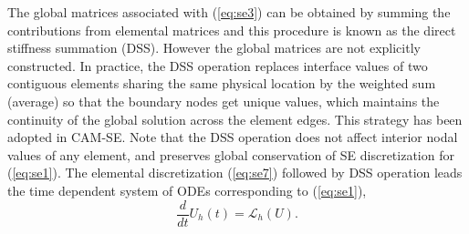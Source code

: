   The  global matrices associated with  (\ref{eq:se3}) can be obtained 
  by  summing the contributions from elemental matrices  and  this procedure is known as the 
  direct stiffness summation (DSS). However the global matrices are  not explicitly constructed. 
  In practice, the DSS operation replaces  interface values  of two  contiguous elements sharing the same physical location  
  by the  weighted sum (average)  so that  the boundary  nodes get unique values,   
   which maintains the continuity of the global solution across the element edges. This strategy has been adopted in CAM-SE. 
  Note that the DSS operation does not affect interior nodal values of any element, and  preserves global conservation of SE discretization
  for (\ref{eq:se1}).  The elemental discretization (\ref{eq:se7}) followed by DSS operation leads the time dependent  system of ODEs corresponding to (\ref{eq:se1}),
     \begin{equation}
  \frac{d }{dt} U_h(t) =   \mathcal{L}_h(U).  \label{eq:se8}
       \end{equation}

   





